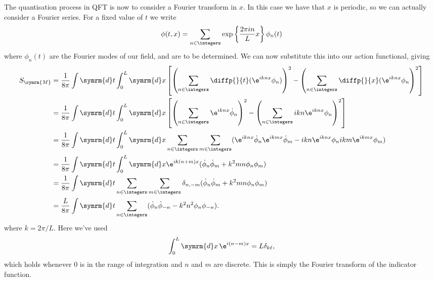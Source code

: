 \documentclass[fleqn]{NotesClass}
\renewcommand{\dl}[1]{\symrm{d}#1}
\newcommand{\minkowski}{\symrm{M}}
\begin{document}
    The quantisation process in QFT is now to consider a Fourier transform in \(x\).
    In this case we have that \(x\) is periodic, so we can actually consider a Fourier series.
    For a fixed value of \(t\) we write
    \begin{equation}
        \phi(t, x) = \sum_{n \in \integers} \exp\left\{ \frac{2\pi in}{L}x \right\} \phi_n(t)
    \end{equation}
    where \(\phi_n(t)\) are the Fourier modes of our field, and are to be determined.
    We can now substitute this into our action functional, giving
    \begin{align}
        S_{\minkowski} &= \frac{1}{8\pi} \int \dl{t} \int_0^L \dl{x} \left[ \left( \sum_{n \in \integers} \diffp{}{t}(\e^{iknx}\phi_n) \right)^2 - \left( \sum_{n \in \integers} \diffp{}{x}(\e^{iknx}\phi_n \right)^2 \right]\\
        &= \frac{1}{8\pi} \int \dl{t} \int_0^L \dl{x} \left[ \left( \sum_{n \in \integers} \e^{iknx} \dot{\phi}_n \right)^2 - \left( \sum_{n \in \integers} ikn \e^{iknx} \phi_n \right)^2 \right]\\
        &= \frac{1}{8\pi} \int \dl{t} \int_0^L \dl{x} \sum_{n \in \integers} \sum_{m \in \integers} (\e^{iknx}\dot{\phi}_n \e^{ikmx} \dot{\phi}_m - ikn\e^{iknx}\phi_n ikm\e^{ikmx}\phi_m) \notag\\
        &= \frac{1}{8\pi} \int \dl{t} \int_0^L \dl{x} \e^{ik(n + m)x} (\dot{\phi}_n \dot{\phi}_m + k^2mn \phi_n \phi_m)\\
        &= \frac{1}{8\pi} \int \dl{t} \sum_{n \in \integers} \sum_{m \in \integers} \delta_{n,-m} (\dot{\phi}_n \dot{\phi}_m + k^2 mn \phi_n\phi_m)\\
        &= \frac{L}{8\pi} \int \dl{t} \sum_{n \in \integers} (\dot{\phi}_n \dot{\phi}_{-n} - k^2n^2 \phi_n \phi_{-n}).
    \end{align}
    where \(k = 2\pi/L\).
    Here we've used
    \begin{equation}
        \int_0^L \dl{x} \, \e^{i(n - m)x} = L\delta_{k\ell},
    \end{equation}
    which holds whenever \(0\) is in the range of integration and \(n\) and \(m\) are discrete.
    This is simply the Fourier transform of the indicator function.
    
\end{document}
